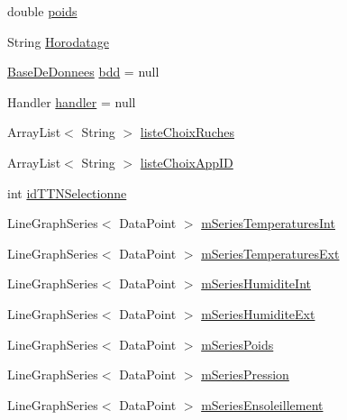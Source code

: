 \begin{DoxyCompactItemize}
double \hyperlink{classfr_1_1campus_1_1laurainc_1_1honeybee_1_1_ruche_a9e4ace1f74bc297cb50e99643203367b}{poids}
\item 
String \hyperlink{classfr_1_1campus_1_1laurainc_1_1honeybee_1_1_ruche_af4135c56131bb6afd191538b12c298d7}{Horodatage}
\item 
\hyperlink{classfr_1_1campus_1_1laurainc_1_1honeybee_1_1_base_de_donnees}{Base\+De\+Donnees} \hyperlink{classfr_1_1campus_1_1laurainc_1_1honeybee_1_1_ruche_a0eb43a2b63fb83e9d5af6cd6b754c7da}{bdd} = null
\item 
Handler \hyperlink{classfr_1_1campus_1_1laurainc_1_1honeybee_1_1_ruche_a9689ca454694434549e5fffca876ffae}{handler} = null
\item 
Array\+List$<$ String $>$ \hyperlink{classfr_1_1campus_1_1laurainc_1_1honeybee_1_1_ruche_accb6ae9a3a546857525f0e1cdc023250}{liste\+Choix\+Ruches}
\item 
Array\+List$<$ String $>$ \hyperlink{classfr_1_1campus_1_1laurainc_1_1honeybee_1_1_ruche_a839228c6a5015c4c3db018316e4e776f}{liste\+Choix\+App\+ID}
\item 
int \hyperlink{classfr_1_1campus_1_1laurainc_1_1honeybee_1_1_ruche_a4f7b012e98299ef15fbce3b60930fefb}{id\+T\+T\+N\+Selectionne}
\item 
Line\+Graph\+Series$<$ Data\+Point $>$ \hyperlink{classfr_1_1campus_1_1laurainc_1_1honeybee_1_1_ruche_a0fe6febbc698e5c0ed34783a9cbb7719}{m\+Series\+Temperatures\+Int}
\item 
Line\+Graph\+Series$<$ Data\+Point $>$ \hyperlink{classfr_1_1campus_1_1laurainc_1_1honeybee_1_1_ruche_a67713d2f8d0adba8ac6ef782001e23a1}{m\+Series\+Temperatures\+Ext}
\item 
Line\+Graph\+Series$<$ Data\+Point $>$ \hyperlink{classfr_1_1campus_1_1laurainc_1_1honeybee_1_1_ruche_af36001cde96599deef784d3be498ae65}{m\+Series\+Humidite\+Int}
\item 
Line\+Graph\+Series$<$ Data\+Point $>$ \hyperlink{classfr_1_1campus_1_1laurainc_1_1honeybee_1_1_ruche_abe6075db6a4cd92a43a0972514b4b552}{m\+Series\+Humidite\+Ext}
\item 
Line\+Graph\+Series$<$ Data\+Point $>$ \hyperlink{classfr_1_1campus_1_1laurainc_1_1honeybee_1_1_ruche_ac181c5f8d7cc950c4f015d8abccf44d8}{m\+Series\+Poids}
\item 
Line\+Graph\+Series$<$ Data\+Point $>$ \hyperlink{classfr_1_1campus_1_1laurainc_1_1honeybee_1_1_ruche_ab042d6976e773befe0f4beab70951a52}{m\+Series\+Pression}
\item 
Line\+Graph\+Series$<$ Data\+Point $>$ \hyperlink{classfr_1_1campus_1_1laurainc_1_1honeybee_1_1_ruche_a46b1a74ed27674490aff13504ce39b5a}{m\+Series\+Ensoleillement}

\end{DoxyCompactItemize}
